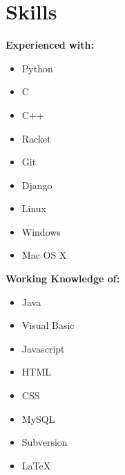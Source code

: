 \documentclass[10pt]{article}
\begin{document}
\begin{minipage}{0.23\textwidth}
\centering\section*{\LARGE\sffamily\color{resblue}Skills}
  \raggedright{\bf Experienced with:}
  \begin{itemize}[label={\color{resblue}\textbullet}]
    \setlength\itemsep{0em}
    \item Python
    \item C
    \item C++
    \item Racket
    \item Git
    \item Django
    \item Linux
    \item Windows
    \item Mac OS X
  \end{itemize}
  \vspace{5mm}
  {\bf Working Knowledge of:}
  \begin{itemize}[label={\color{resblue}\textbullet}]
    \setlength\itemsep{0em}
    \item Java
    \item Visual Basic
    \item Javascript
    \item HTML
    \item CSS
    \item MySQL
    \item Subversion
    \item \LaTeX
  \end{itemize}
\end{minipage}
\end{document}
